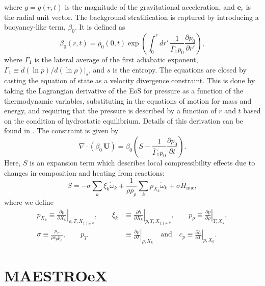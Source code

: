\documentclass[a4paper]{jpconf}
\newcommand{\Ub}{{\,\bm{U}}}
\newcommand{\pd}[2]{\frac{\partial #1}{\partial #2}}
\begin{document}
where $g = g(r,t)$ is the magnitude of the gravitational acceleration, and $\bm{e}_r$ is the radial unit vector. The background stratification is captured by introducing a buoyancy-like term, $\beta_0$. It is defined as 
\begin{equation}
    \beta_0(r,t) = \rho_0(0,t) \exp\left(\int_0^r dr'\, \frac{1}{\overline{\Gamma}_1p_0}\pd{p_0}{r'} \right),
\end{equation}
where $\overline{\Gamma}_1$ is the lateral average of the first adiabatic exponent, $\Gamma_1 \equiv d(\ln p)/d(\ln \rho)|_s$, and $s$ is the entropy. The equations are closed by casting the equation of state as a velocity divergence constraint. This is done by taking the Lagrangian derivative of the EoS for pressure as a function of the thermodynamic variables, substituting in the equations of motion for mass and energy, and requiring that the pressure is described by a function of $r$ and $t$ based on the condition of hydrostatic equilibrium. Details of this derivation can be found in \cite{Almgren2006a,Almgren2006b}. The constraint is given by 
\begin{equation}
    \nabla\cdot\left(\beta_0\Ub\right) = \beta_0 \left(S - \frac{1}{\overline{\Gamma}_1 p_0}\pd{p_0}{t} \right).
\end{equation}
Here, $S$ is an expansion term which describes local compressibility effects due to changes in composition and heating from reactions:
\begin{equation}
    S = -\sigma \sum_k \xi_k\dot{\omega}_k + \frac{1}{\rho p_\rho}\sum_k p_{X_k}\dot{\omega}_k + \sigma H_{\mathrm{nuc}},
\end{equation}
where we define 
\begin{align*}
    p_{X_k} \equiv \left.\pd{p}{X_k}\right|_{\rho,T,X_{j,j\neq k}},\qquad
     \xi_k&\equiv \left.\pd{h}{X_k}\right|_{p, T,X_{j,j\neq k}},\qquad
     p_\rho\equiv \left.\pd{p}{\rho}\right|_{T, X_k},\\
     \sigma \equiv \frac{p_T}{\rho c_p p_\rho}, \qquad
     p_T&\equiv \left.\pd{p}{T}\right|_{\rho, X_k} \quad\mathrm{and}\quad 
     c_p\equiv \left.\pd{h}{T}\right|_{p, X_k}.
\end{align*}


\section{MAESTROeX} \label{sec:maestroex}
\end{document}
